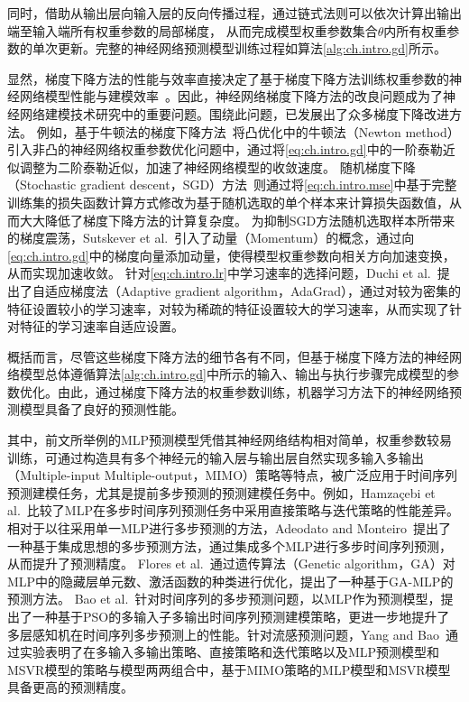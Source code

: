 同时，借助从输出层向输入层的反向传播过程，通过链式法则可以依次计算出输出端至输入端所有权重参数的局部梯度，
从而完成模型权重参数集合\(\theta\)内所有权重参数的单次更新。完整的神经网络预测模型训练过程如算法\ref{alg:ch.intro.gd}所示。

显然，梯度下降方法的性能与效率直接决定了基于梯度下降方法训练权重参数的神经网络模型性能与建模效率~\cite{liuImproved2020}。因此，神经网络梯度下降方法的改良问题成为了神经网络建模技术研究中的重要问题。围绕此问题，已发展出了众多梯度下降改进方法。
例如，基于牛顿法的梯度下降方法~\cite{bennettNewton1916}将凸优化中的牛顿法（Newton method）引入非凸的神经网络权重参数优化问题中，通过将\autoref{eq:ch.intro.gd}中的一阶泰勒近似调整为二阶泰勒近似，加速了神经网络模型的收敛速度\cite{nesterovMethod1983a,nesterovCubic2006}。
随机梯度下降（Stochastic gradient descent，SGD）方法~\cite{bottouStochastic2012}则通过将\autoref{eq:ch.intro.mse}中基于完整训练集的损失函数计算方式修改为基于随机选取的单个样本来计算损失函数值，从而大大降低了梯度下降方法的计算复杂度。
为抑制SGD方法随机选取样本所带来的梯度震荡，Sutskever et al.~\cite{sutskeverImportance2013}引入了动量（Momentum）的概念，通过向\autoref{eq:ch.intro.gd}中的梯度向量添加动量，使得模型权重参数向相关方向加速变换，从而实现加速收敛。
针对\autoref{eq:ch.intro.lr}中学习速率的选择问题，Duchi et al.~\cite{duchiAdaptive2011}提出了自适应梯度法（Adaptive gradient algorithm，AdaGrad），通过对较为密集的特征设置较小的学习速率，对较为稀疏的特征设置较大的学习速率，从而实现了针对特征的学习速率自适应设置。

概括而言，尽管这些梯度下降方法的细节各有不同，但基于梯度下降方法的神经网络模型总体遵循算法\ref{alg:ch.intro.gd}中所示的输入、输出与执行步骤完成模型的参数优化。由此，通过梯度下降方法的权重参数训练，机器学习方法下的神经网络预测模型具备了良好的预测性能。

其中，前文所举例的MLP预测模型凭借其神经网络结构相对简单，权重参数较易训练，可通过构造具有多个神经元的输入层与输出层自然实现多输入多输出（Multiple-input Multiple-output，MIMO）策略等特点，被广泛应用于时间序列预测建模任务，尤其是提前多步预测的预测建模任务中。例如，Hamzaçebi et al.~\cite{hamzacebiComparison2009}比较了MLP在多步时间序列预测任务中采用直接策略与迭代策略的性能差异。相对于以往采用单一MLP进行多步预测的方法，Adeodato and Monteiro~\cite{adeodatoMLP2011}提出了一种基于集成思想的多步预测方法，通过集成多个MLP进行多步时间序列预测，从而提升了预测精度。
Flores et al.~\cite{floresEvolutive2012}通过遗传算法（Genetic algorithm，GA）对MLP中的隐藏层单元数、激活函数的种类进行优化，提出了一种基于GA-MLP的预测方法。
Bao et al.~\cite{baoPSOMISMO2014}针对时间序列的多步预测问题，以MLP作为预测模型，提出了一种基于PSO的多输入子多输出时间序列预测建模策略，更进一步地提升了多层感知机在时间序列多步预测上的性能。针对流感预测问题，Yang and Bao~\cite{yangComprehensive2021}通过实验表明了在多输入多输出策略、直接策略和迭代策略以及MLP预测模型和MSVR模型的策略与模型两两组合中，基于MIMO策略的MLP模型和MSVR模型具备更高的预测精度。

